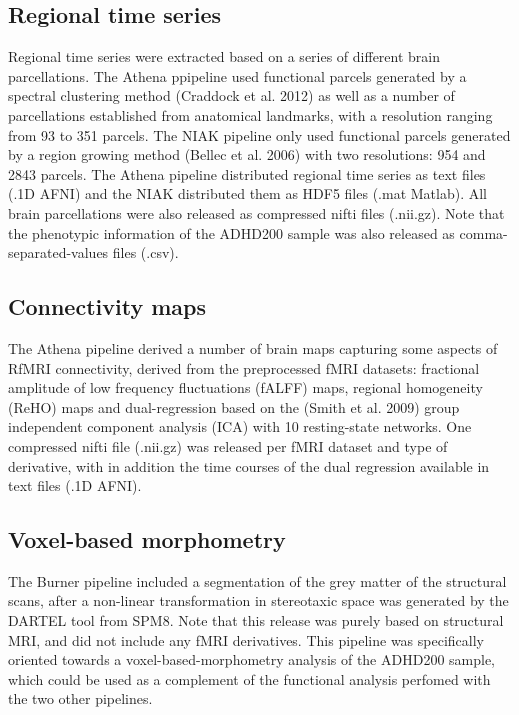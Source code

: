 \documentclass[preprint,12pt,3p]{elsarticle}
\begin{document}
\subsection{Regional time series} Regional time series were extracted based on a series of different brain parcellations. The Athena ppipeline used functional parcels generated by a spectral clustering method (Craddock et al. 2012) as well as a number of parcellations established from anatomical landmarks, with a resolution ranging from 93 to 351 parcels. The NIAK pipeline only used functional parcels generated by a region growing method (Bellec et al. 2006) with two resolutions: 954 and 2843 parcels. The Athena pipeline distributed regional time series as text files (.1D AFNI) and the NIAK distributed them as HDF5 files (.mat Matlab). All brain parcellations were also released as compressed nifti files (.nii.gz). Note that the phenotypic information of the ADHD200 sample was also released as comma-separated-values files (.csv). 

\subsection{Connectivity maps}
The Athena pipeline derived a number of brain maps capturing some aspects of RfMRI connectivity, derived from the preprocessed fMRI datasets: fractional amplitude of low frequency fluctuations (fALFF) maps, regional homogeneity (ReHO) maps and dual-regression based on the (Smith et al. 2009) group independent component analysis (ICA) with 10 resting-state networks. One compressed nifti file (.nii.gz) was released per fMRI dataset and type of derivative, with in addition the time courses of the dual regression available in text files (.1D AFNI).

\subsection{Voxel-based morphometry}

The Burner pipeline included a segmentation of the grey matter of the structural scans, after a non-linear transformation in stereotaxic space was generated by the DARTEL tool from SPM8. Note that this release was purely based on structural MRI, and did not include any fMRI derivatives. This pipeline was specifically oriented towards a voxel-based-morphometry analysis of the ADHD200 sample, which could be used as a complement of the functional analysis perfomed with the two other pipelines. 
\end{document}
